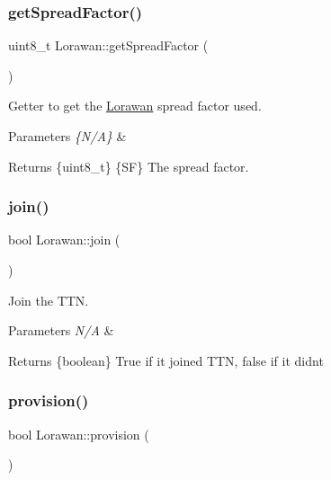 \subsubsection{\texorpdfstring{get\+Spread\+Factor()}{getSpreadFactor()}}
{\footnotesize\ttfamily uint8\+\_\+t Lorawan\+::get\+Spread\+Factor (\begin{DoxyParamCaption}{ }\end{DoxyParamCaption})}

Getter to get the \mbox{\hyperlink{class_lorawan}{Lorawan}} spread factor used. 
\begin{DoxyParams}{Parameters}
{\em \{\+N/\+A\}} & \\
\hline
\end{DoxyParams}
\begin{DoxyReturn}{Returns}
\{uint8\+\_\+t\} \{SF\} The spread factor. 
\end{DoxyReturn}
\mbox{\label{class_lorawan_a590a79393a24359a9cc69bb133f72d56}} 
\subsubsection{\texorpdfstring{join()}{join()}}
{\footnotesize\ttfamily bool Lorawan\+::join (\begin{DoxyParamCaption}{ }\end{DoxyParamCaption})}

Join the T\+TN. 
\begin{DoxyParams}{Parameters}
{\em N/A} & \\
\hline
\end{DoxyParams}
\begin{DoxyReturn}{Returns}
\{boolean\} True if it joined T\+TN, false if it didn\textquotesingle{}t 
\end{DoxyReturn}
\mbox{\label{class_lorawan_ad8e01477e0f83ffd15a75309ee94ecc2}} 
\subsubsection{\texorpdfstring{provision()}{provision()}}
{\footnotesize\ttfamily bool Lorawan\+::provision (\begin{DoxyParamCaption}{ }\end{DoxyParamCaption})}

